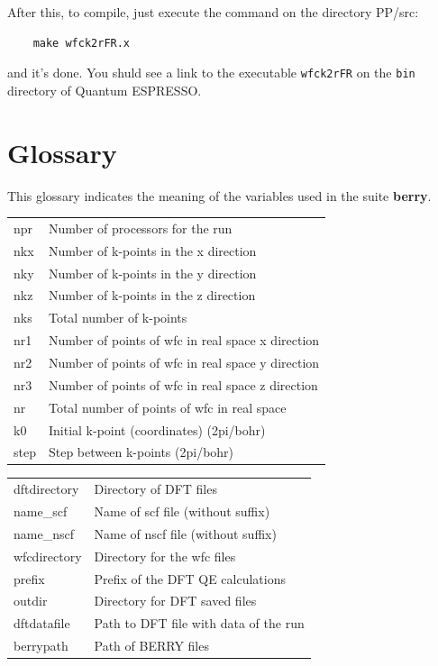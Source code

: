 \documentclass[a4paper,12pt]{report}
\begin{document}
\begin{appendices}
After this, to compile, just execute the command on the directory PP/src:

\begin{verbatim}
    make wfck2rFR.x
\end{verbatim}
and it's done.
You shuld see a link to the executable \verb|wfck2rFR| on the \verb|bin| directory of {\sc Quantum ESPRESSO}.

\chapter{Glossary}

This glossary indicates the meaning of the variables used in the suite \textbf{berry}.
\vspace{0.5cm}

\begin{tabularx}{0.9\textwidth}{lX}
 npr            & Number of processors for the run \\

 nkx            & Number of k-points in the x direction \\
 nky            & Number of k-points in the y direction \\
 nkz            & Number of k-points in the z direction \\
 nks            & Total number of k-points \\

 nr1            & Number of points of wfc in real space x direction \\
 nr2            & Number of points of wfc in real space y direction \\
 nr3            & Number of points of wfc in real space z direction \\
 nr             & Total number of points of wfc in real space \\

 k0             & Initial k-point (coordinates) (2pi/bohr) \\
 step           & Step between k-points (2pi/bohr) \\
\end{tabularx}
\vspace{0.5cm}

\begin{tabularx}{0.9\textwidth}{lX}
 dftdirectory    & Directory of DFT files \\
 name\_scf       & Name of scf file (without suffix) \\
 name\_nscf      & Name of nscf file (without suffix) \\
 wfcdirectory   & Directory for the wfc files \\
 prefix         & Prefix of the DFT QE calculations \\
 outdir         & Directory for DFT saved files \\
 dftdatafile    & Path to DFT file with data of the run \\
 berrypath      & Path of BERRY files \\
\end{tabularx}
\vspace{0.5cm}


\end{appendices}
\end{document}
